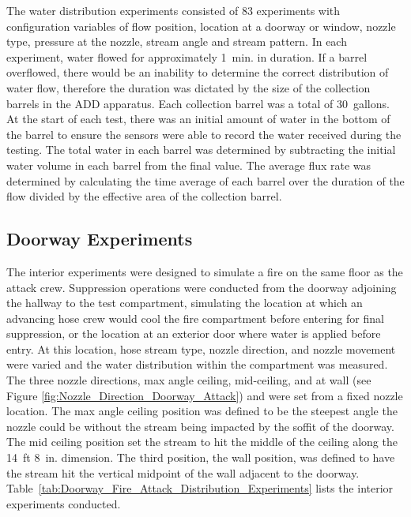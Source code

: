 \documentclass[12pt,oneside]{book}
\begin{document}
The water distribution experiments consisted of 83 experiments with configuration variables of flow position, location at a doorway or window, nozzle type, pressure at the nozzle, stream angle and stream pattern. In each experiment, water flowed for approximately 1~min. in duration. If a barrel overflowed, there would be an inability to determine the correct distribution of water flow, therefore the duration was dictated by the size of the collection barrels in the ADD apparatus. Each collection barrel was a total of 30~gallons.  At the start of each test, there was an initial amount of water in the bottom of the barrel to ensure the sensors were able to record the water received during the testing. The total water in each barrel was determined by subtracting the initial water volume in each barrel from the final value. The average flux rate was determined by calculating the time average of each barrel over the duration of the flow divided by the effective area of the collection barrel. 

\subsection{Doorway Experiments}
\label{int_tests}
The interior experiments were designed to simulate a fire on the same floor as the attack crew. Suppression operations were conducted from the doorway adjoining the hallway to the test compartment, simulating the location at which an advancing hose crew would cool the fire compartment before entering for final suppression, or the location at an exterior door where water is applied before entry. At this location, hose stream type, nozzle direction, and nozzle movement were varied and the water distribution within the compartment was measured. The three nozzle directions, max angle ceiling, mid-ceiling, and at wall (see Figure \ref{fig:Nozzle_Direction_Doorway_Attack}) and were set from a fixed nozzle location. The max angle ceiling position was defined to be the steepest angle the nozzle could be without the stream being impacted by the soffit of the doorway. The mid ceiling position set the stream to hit the middle of the ceiling along the 14~ft 8~in. dimension. The third position, the wall position, was defined to have the stream hit the vertical midpoint of the wall adjacent to the doorway. Table~\ref{tab:Doorway_Fire_Attack_Distribution_Experiments} lists the interior experiments conducted.
\end{document}
